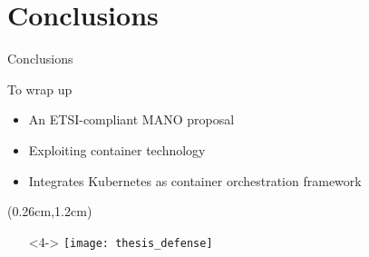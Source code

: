 \section{Conclusions}
\begin{frame}{Conclusions}

  To wrap up
  \begin{itemize}
  \item<1-> An ETSI-compliant MANO proposal
  \item<2-> Exploiting container technology
  \item<3-> Integrates Kubernetes as container orchestration framework
  \end{itemize}

  \begin{textblock*}{5cm}(0.26cm,1.2cm)
    \begin{itemize}
      \item[]<4-> \centering \texttt{[image: thesis\_defense]}
    \end{itemize}
  \end{textblock*}
\end{frame}
